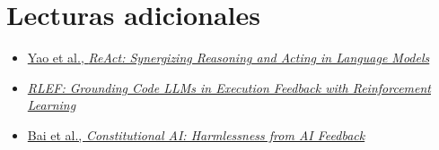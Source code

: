 \section{Lecturas adicionales}

\begin{itemize}
    \item \href{https://arxiv.org/abs/2210.03629}{Yao et al., \emph{ReAct: Synergizing Reasoning and Acting in Language Models}}
    \item \href{https://arxiv.org/abs/2410.02089}{\emph{RLEF: Grounding Code LLMs in Execution Feedback with Reinforcement Learning}}
    \item \href{https://arxiv.org/abs/2212.08073}{Bai et al., \emph{Constitutional AI: Harmlessness from AI Feedback}}
\end{itemize}

